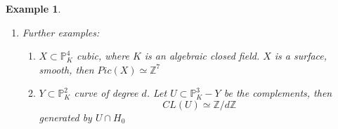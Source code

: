 \documentclass[11pt]{article}
\newtheorem{ex}[thm]{Example}
\newcommand{\proj}{\mathbb P}
\newcommand{\intg}{\mathbb Z}
\renewcommand{\div}{\textnormal{div}}
\newcommand{\Lrta}{\Longrightarrow}
\newcommand{\lrta}{\longrightarrow}
\begin{document}
\begin{ex}
\begin{enumerate}[label=(\arabic*)]
\begin{proof}
\begin{enumerate}[label=(\alph*)]
$\Lrta$
$$
\begin{aligned}
\underline{deg}(\div(f))&=\sum n_i \underline{deg}(D_i-\sum m_j \underline{deg}(E_j)\\ 
&(\underline{deg}(D_i)=deg(h_i),\underline{deg}(E_j)=deg(k_j))\\
&=deg(g_1)-deg(g_2)=0.
\end{aligned}
$$
Then we come back to prove the \underline{Key fact}:
$$
f_1=\sum_{\underline{d}}\alpha_{\underline{d}} \left(\frac{X_0}{X_0}\right)^{d_0}\cdots \left(\frac{X_n}{X_0}\right)^{d_n}
$$
e.g.
$$
\begin{aligned}
&\left(\frac{X_1}{X_0}\right)^{2}+37 \left(\frac{X_1}{X_0}\right)^{3}\left(\frac{X_2}{X_0}\right)\\
&=\frac{X_0^2X_1^2+37X_1^3X_2}{X_0^4}\\
&=\frac{1}{X_0^{deg f_1}}\sum_{\underline{d}}\alpha_{\underline{d}} X_0^{deg f_1-\sum_{i=1}^n d_i} X_1^{}d_1\cdots X_n^{d_n}\\
&=\frac{\text{homogeneous degree $deg f_1$}}{X_0^{deg f_1}}\\
\end{aligned}
$$
$$
\Lrta f_2=\frac{\text{homogeneous degree $deg f_2$}}{X_0^{deg f_2}}\\
$$
$$
\Lrta \frac{f_1}{f_2}=\frac{X_0^{ deg f_1}(deg f_1)}{(deg f_2) X_0^{deg f_1}}
$$

\item $\underline{deg}: Cl(X)\lrta \intg$ is surjective because $\underline{deg}(D_0)=1$, $D_0$ associated to $X_0$ and injective because if $deg(D)=0$ write $D=D_1-D_2$ with $D_1,D_2$ effective then $\underline{deg}(D_1)=\underline{deg}(D_2)$. Write 
$D_1=\sum n_i E_i$, where $E_i$ is prime divisors associated to $h_i$. 
$D_2=\sum m_j F_j$, where $F_j$ is prime divisors associated to $k_j$. 


Then let $f=\prod h_i ^{n_i}\prod k_j^{- m_j}\in K(X)^\times$, and as shown above $dic(f)=D_1-D_2=D$ so $D$ is  $0$ in $Cl(X)$.
\item the proof can be found in Hartshorne
\end{enumerate}
\end{proof}
\item Further examples: 
\begin{enumerate}[label=(\alph*)]
\item $X\subset \proj^4_K$ cubic, where $K$ is an algebraic closed field. $X$ is a  surface, smooth, then $Pic(X)\simeq \intg^7$
\item $Y\subset \proj^2_K$ curve of degree $d$. Let $U\subset \proj^3_K-Y$ be the complements, then 
$$
CL(U)\simeq \intg/d\intg
$$
generated by $U\cap H_0$
\end{enumerate}
\end{enumerate}
\end{ex}
\end{document}
